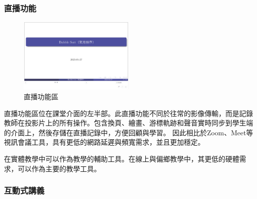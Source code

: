 \subsubsection{直播功能}

\begin{figure}[H]
  \centering
  \includegraphics[width=0.5\textwidth]{images/streaming.png}
  \caption{直播功能區}
\end{figure}

直播功能區位在課堂介面的左半部。此直播功能不同於往常的影像傳輸，而是記錄教師在投影片上的所有操作。包含換頁、繪畫、游標軌跡和聲音實時同步到學生端的介面上，然後存儲在直播記錄中，方便回顧與學習。
因此相比於Zoom、Meet等視訊會議工具，具有更低的網路延遲與頻寬需求，並且更加穩定。

在實體教學中可以作為教學的輔助工具。在線上與偏鄉教學中，其更低的硬體需求，可以作為主要的教學工具。

\subsubsection{互動式講義}


